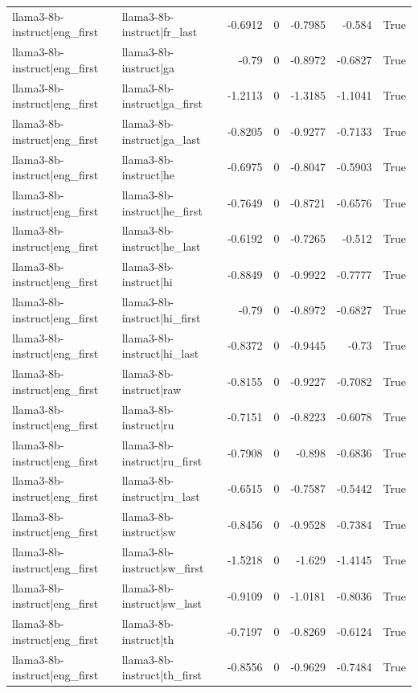 \begin{table}
\begin{tabular}{l l r r r r l}
llama3-8b-instruct|eng_first & llama3-8b-instruct|fr_last & -0.6912 & 0 & -0.7985 & -0.584 & True \\
llama3-8b-instruct|eng_first & llama3-8b-instruct|ga & -0.79 & 0 & -0.8972 & -0.6827 & True \\
llama3-8b-instruct|eng_first & llama3-8b-instruct|ga_first & -1.2113 & 0 & -1.3185 & -1.1041 & True \\
llama3-8b-instruct|eng_first & llama3-8b-instruct|ga_last & -0.8205 & 0 & -0.9277 & -0.7133 & True \\
llama3-8b-instruct|eng_first & llama3-8b-instruct|he & -0.6975 & 0 & -0.8047 & -0.5903 & True \\
llama3-8b-instruct|eng_first & llama3-8b-instruct|he_first & -0.7649 & 0 & -0.8721 & -0.6576 & True \\
llama3-8b-instruct|eng_first & llama3-8b-instruct|he_last & -0.6192 & 0 & -0.7265 & -0.512 & True \\
llama3-8b-instruct|eng_first & llama3-8b-instruct|hi & -0.8849 & 0 & -0.9922 & -0.7777 & True \\
llama3-8b-instruct|eng_first & llama3-8b-instruct|hi_first & -0.79 & 0 & -0.8972 & -0.6827 & True \\
llama3-8b-instruct|eng_first & llama3-8b-instruct|hi_last & -0.8372 & 0 & -0.9445 & -0.73 & True \\
llama3-8b-instruct|eng_first & llama3-8b-instruct|raw & -0.8155 & 0 & -0.9227 & -0.7082 & True \\
llama3-8b-instruct|eng_first & llama3-8b-instruct|ru & -0.7151 & 0 & -0.8223 & -0.6078 & True \\
llama3-8b-instruct|eng_first & llama3-8b-instruct|ru_first & -0.7908 & 0 & -0.898 & -0.6836 & True \\
llama3-8b-instruct|eng_first & llama3-8b-instruct|ru_last & -0.6515 & 0 & -0.7587 & -0.5442 & True \\
llama3-8b-instruct|eng_first & llama3-8b-instruct|sw & -0.8456 & 0 & -0.9528 & -0.7384 & True \\
llama3-8b-instruct|eng_first & llama3-8b-instruct|sw_first & -1.5218 & 0 & -1.629 & -1.4145 & True \\
llama3-8b-instruct|eng_first & llama3-8b-instruct|sw_last & -0.9109 & 0 & -1.0181 & -0.8036 & True \\
llama3-8b-instruct|eng_first & llama3-8b-instruct|th & -0.7197 & 0 & -0.8269 & -0.6124 & True \\
llama3-8b-instruct|eng_first & llama3-8b-instruct|th_first & -0.8556 & 0 & -0.9629 & -0.7484 & True \\

\end{tabular}
\end{table}
